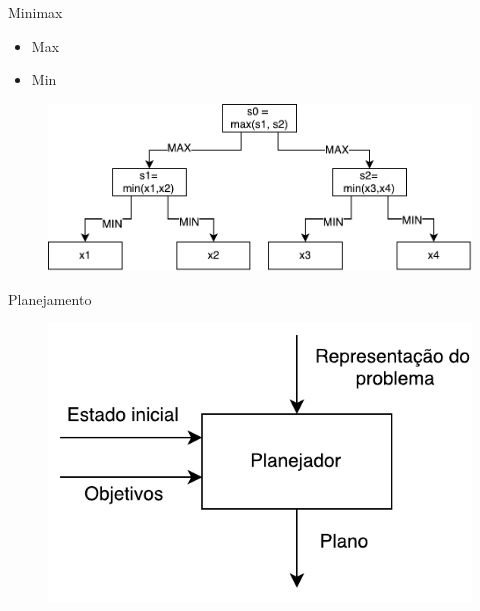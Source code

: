 \documentclass{beamer}
\begin{document}
\begin{frame}{Minimax}
	\begin{itemize}
		\item Max
		\item Min
	\end{itemize}
	
	\vspace{-3mm}
	\begin{figure}[here]
		\includegraphics[width=0.8\linewidth]{fig/gametree.pdf}	
	\end{figure}	
\end{frame}

\begin{frame}{Planejamento}
	
	\vspace{-3mm}
	\begin{figure}[here]
		\includegraphics[width=0.6\linewidth]{fig/modelo.pdf}	
	\end{figure}	
\end{frame}
\end{document}
